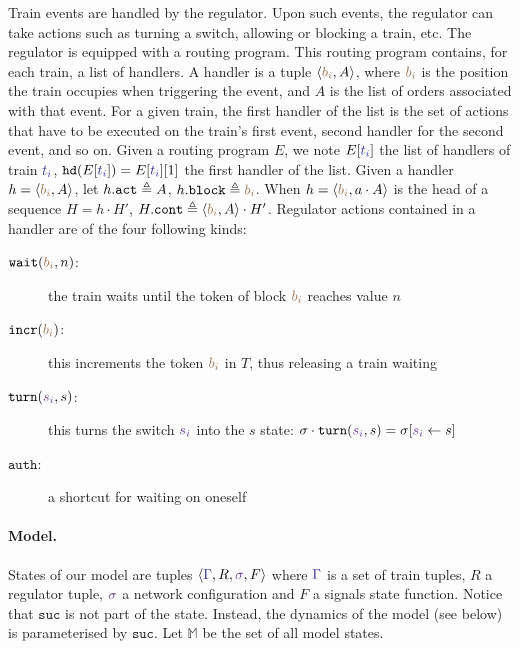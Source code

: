 \documentclass[runningheads]{llncs}
\newcommand{\tuple}[1]{\ensuremath{\langle #1\rangle}}
\newcommand{\sucblock}{{\mathtt{suc}}}
\newcommand{\modelSet}{\ensuremath{\mathbb{M}}}
\newcommand{\posFmt}[1]{{\color{poscolor}{#1}}}
\newcommand{\bid}[1]{\ensuremath{\posFmt{b_{#1}}}}
\newcommand{\swFmt}[1]{{\color{swcolor}{#1}}}
\newcommand{\sid}[1]{\ensuremath{\swFmt{s_{#1}}}}
\newcommand{\switches}{\ensuremath{\swFmt{\sigma}}}
\newcommand{\trainFmt}[1]{{\color{traincolor} #1}}
\newcommand{\trainSeq}{\ensuremath{\trainFmt{\Gamma}}\xspace}
\newcommand{\tid}[1]{\ensuremath{\trainFmt{t_{#1}}}}
\newcommand{\handlerOf}[2]{\ensuremath{#1[\trainFmt{#2}]}}
\newcommand{\popHandlerHead}[2]{\ensuremath{{\tt pop}(#1[\trainFmt{#2}])}}
\newcommand{\actionsOf}[1]{\ensuremath{#1.{\tt act}}}
\newcommand{\blockOf}[1]{\ensuremath{#1.{\tt block}}}
\newcommand{\handler}[2]{\tuple{#1, #2}}
\newcommand{\nextAct}[1]{\ensuremath{#1.{\tt cont}}}
\newcommand{\incr}[1]{{\mbox{\ensuremath{\mathtt{incr}(\posFmt{#1})}}}\xspace}
\newcommand{\turn}[2]{{\mbox{\ensuremath{\mathtt{turn}(#1, #2)}}}\xspace}
\newcommand{\auth}{{\mbox{\ensuremath{\mathtt{auth}}}}\xspace}
\newcommand{\regulator}{\ensuremath{R}}
\newcommand{\wait}[2]{{\mbox{\ensuremath{\mathtt{wait}(\posFmt{#1}, #2)}}}\xspace}
\newcommand{\signals}{\ensuremath{F}}
\newcommand{\bufferFmt}[1]{#1}
\newcommand{\head}[1]{\ensuremath{{\tt hd}(#1)}}
\newcommand{\buftail}[1]{\ensuremath{{\tt tl}(\bufferFmt{#1})}}
\begin{document}
Train events are handled by the regulator. Upon such events, the regulator can take actions such as turning a switch, allowing or blocking a train, etc. The regulator is equipped with a routing program. This routing program contains, for each train, a list of handlers. A handler is a tuple $\tuple{\bid{i}, A}$, where $\bid{i}$ is the position the train occupies when triggering the event, and $A$ is the list of orders associated with that event. For a given train, the first handler of the list is the set of actions that have to be executed on the train's first event, second handler for the second event, and so on.
Given a routing program $E$, we note $\handlerOf{E}{\tid{i}}$ the list of handlers of train $\tid{i}$, $\head{\handlerOf{E}{\tid{i}}} = \handlerOf{E}{\tid{i}}[1]$ the first handler of the list. Given a handler $h = \tuple{\bid{i}, A}$, let  $\actionsOf{h} \triangleq A$, $\blockOf{h} \triangleq \bid{i}$. When $h = \tuple{\bid{i}, a \cdot A}$ is the head of a sequence $H = h \cdot H'$,  $\nextAct{H} \triangleq \tuple{\bid{i}, A} \cdot H'$. %
Regulator actions contained in a handler are of the four following kinds:
\begin{description}
	\item [\wait{\bid{i}}{n}:] the train waits until the token of block \bid{i} reaches value $n$
	\item [\incr{\bid{i}}:] this increments the token $\bid{i}$ in $T$, thus releasing a train waiting
	\item [\turn{\sid{i}}{s}:] this turns the switch $\sid{i}$ into the $s$ state: $\sigma\cdot\turn{\sid{i}}{s} = \sigma[\sid{i} \leftarrow s]$
	\item [\auth:] a shortcut for waiting on oneself
\end{description}

\paragraph{Model.}
States of our model are tuples $\tuple{\trainSeq, \regulator, \switches, \signals}$ where $\trainSeq$ is a set of train tuples, $\regulator$ a regulator tuple, $\switches$ a network configuration and $\signals$ a signals state function.
 Notice that $\sucblock$ is not part of the state. Instead, the dynamics of the model (see below) is parameterised by $\sucblock$. Let $\modelSet$ be the set of all model states.
\end{document}
